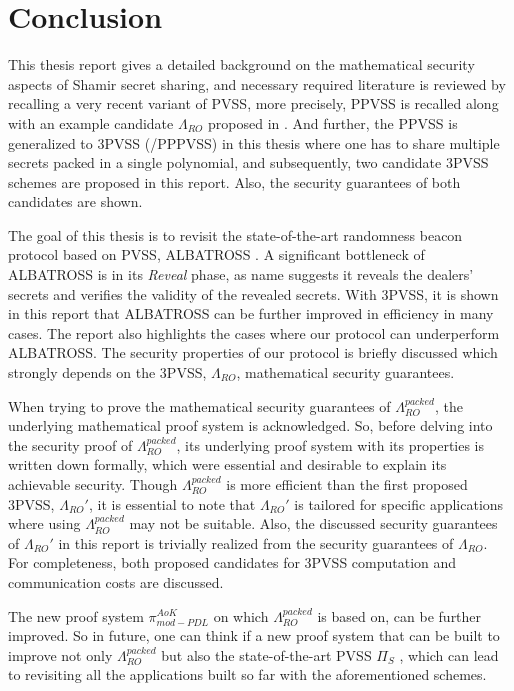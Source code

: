 \chapter{Conclusion}
\label{cha:conclusion}
This thesis report gives a detailed background on the mathematical security aspects of 
Shamir secret sharing, and necessary required literature is reviewed by recalling a 
very recent variant of PVSS, more precisely, PPVSS is recalled along with an example 
candidate $\Lambda_{RO}$ proposed in \cite{cryptoeprint:2025/576}. And further, the PPVSS is generalized 
to 3PVSS (/PPPVSS) in this thesis where one has to share multiple 
secrets packed in a single polynomial, and subsequently, two candidate 3PVSS schemes 
are proposed in this report. Also, the security guarantees of both candidates are shown.\par

The goal of this thesis is to revisit the state-of-the-art randomness beacon protocol 
based on PVSS, ALBATROSS \cite{cryptoeprint:2020/644}. A significant bottleneck of 
ALBATROSS is in its \textit{Reveal} phase, as name suggests it reveals the dealers' secrets 
and verifies the validity of the revealed secrets. With 3PVSS, it is shown in this 
report that ALBATROSS can be further improved in efficiency in many cases. The report 
also highlights the cases where our protocol can underperform ALBATROSS. The security 
properties of our protocol is briefly discussed which strongly depends on the 3PVSS, 
$\Lambda_{RO}$, mathematical security guarantees.\par

When trying to prove the mathematical security guarantees of $\Lambda_{RO}^{packed}$,  
the underlying mathematical proof system is acknowledged. So, before delving into the 
security proof of $\Lambda_{RO}^{packed}$, its underlying proof system with its properties 
is written down formally, which were essential and desirable to explain its 
achievable security. Though $\Lambda_{RO}^{packed}$ is more efficient than the first 
proposed 3PVSS, $\Lambda_{RO}'$, it is essential to note that $\Lambda_{RO}'$ is tailored 
for specific applications where using $\Lambda_{RO}^{packed}$ may not be suitable. Also, 
the discussed security guarantees of $\Lambda_{RO}'$ in this report is trivially 
realized from the security guarantees of $\Lambda_{RO}$. For completeness, both proposed candidates 
for 3PVSS computation and communication costs are discussed.\par

The new proof system $\pi_{mod-PDL}^{AoK}$ on which $\Lambda_{RO}^{packed}$ is based on, 
can be further improved. So in future, one can think if a new proof system that can be built 
to improve not only $\Lambda_{RO}^{packed}$ but also the state-of-the-art PVSS $\Pi_{S}$ \cite{cryptoeprint:2023/1669}, 
which can lead to revisiting all the applications built so far with the aforementioned schemes.\par

